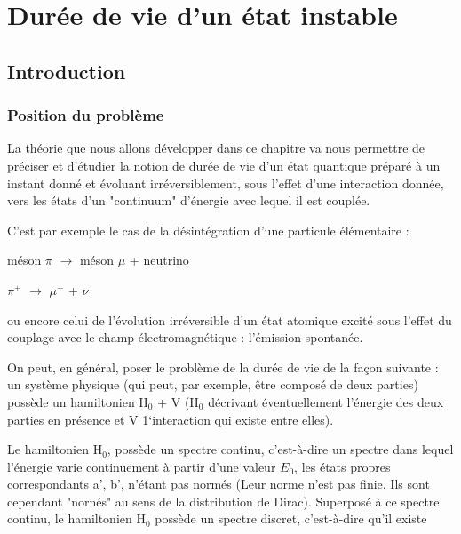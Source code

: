\chapter{Durée de vie d'un état instable}

\section{Introduction}
\subsection{Position du problème}%

La théorie que nous allons développer dans ce chapitre va nous permettre de préciser et d'étudier la notion de durée de vie d'un état quantique
préparé à un instant donné et évoluant irréversiblement, sous l'effet d’une
interaction donnée, vers les états d'un "continuum" d'énergie avec lequel il
est couplée.

C'est par exemple le cas de la désintégration d'une particule élémentaire :
\begin{center}
méson $\pi$ $\to$ méson $\mu$ + neutrino

$\pi^+$ $\to$  $\mu^+$ + $\nu$
\end{center}
ou encore celui de l'évolution irréversible d'un état atomique excité sous
l'effet du couplage avec le champ électromagnétique : l'émission spontanée.

On peut, en général, poser le problème de la durée de vie de la façon
suivante : un système physique (qui peut, par exemple, être composé de deux
parties) possède un hamiltonien H$_0$ + V (H$_0$ décrivant éventuellement l'énergie des
deux parties en présence et V 1‘interaction qui existe entre elles).

Le hamiltonien H$_0$, possède un spectre continu, c'est-à-dire un spectre
dans lequel l'énergie varie continuement à partir d'une valeur $E_0$, les états
propres correspondants a', b', n'étant pas normés (Leur norme n'est pas finie. Ils sont cependant "nornés" au sens de la distribution de Dirac). Superposé à ce spectre continu,
le hamiltonien H$_0$ possède un spectre discret, c'est-à-dire qu'il existe

\begin{center}  \end{center}

